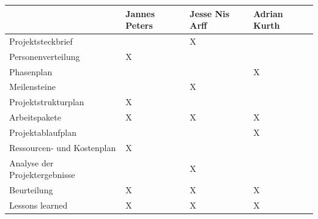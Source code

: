 \documentclass{scrartcl}
\begin{document}
\begin{table}[H]
	\centering
	\label{my-label}
	\begin{tabular}{|l|l|l|l|}
		\hline
		& Jannes Peters & Jesse Nis Arff & Adrian Kurth \\ \hline
		Projektsteckbrief &  &X  &  \\ \hline
		Personenverteilung &X  &  &  \\ \hline
		Phasenplan &  &  &X  \\ \hline
		Meilensteine &  &X  &  \\ \hline
		Projektstrukturplan &X  &  &  \\ \hline
		Arbeitspakete &X  &X  &X  \\ \hline
		Projektablaufplan &  &  &X  \\ \hline
		Ressourcen- und Kostenplan &X  &  &  \\ \hline
		Analyse der Projektergebnisse &  &X  &  \\ \hline
		Beurteilung &X  &X  &X  \\ \hline
		Lessons learned &X  &X  &X  \\ \hline
	\end{tabular}
\end{table}
\end{document}
